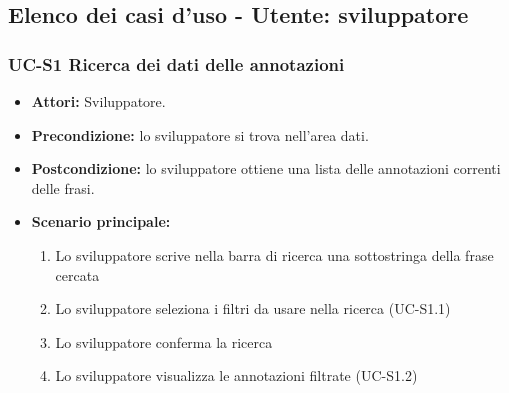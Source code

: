 \subsection{Elenco dei casi d'uso - Utente: sviluppatore}	

\subsubsection{UC-S1 Ricerca dei dati delle annotazioni}
		\begin{itemize}
			\item \textbf{Attori:} Sviluppatore.
			\item \textbf{Precondizione:} lo sviluppatore si trova nell'area dati.
			\item \textbf{Postcondizione:} lo sviluppatore ottiene una lista delle annotazioni correnti delle frasi.
			\item \textbf{Scenario principale:}
				\begin{enumerate}
					\item Lo sviluppatore scrive nella barra di ricerca una sottostringa della frase cercata
					\item Lo sviluppatore seleziona i filtri da usare nella ricerca (UC-S1.1)
					\item Lo sviluppatore conferma la ricerca
					\item Lo sviluppatore visualizza le annotazioni filtrate (UC-S1.2)
				\end{enumerate}
		\end{itemize}
	
